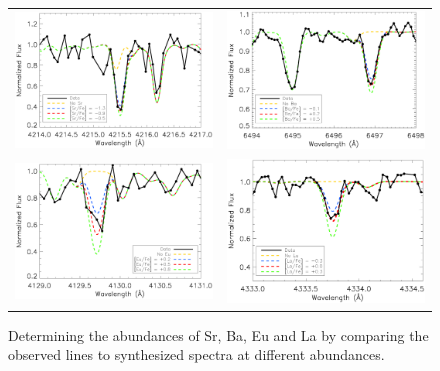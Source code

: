 \documentclass[manuscript]{aastex}
\begin{document}
\begin{figure}
 \begin{center}
  \begin{tabular}{cc}
  \includegraphics[width=8.5cm]{sr4215_synth.ps} & \includegraphics[width=8.5cm]{ba6496_synth.ps} \\
  \includegraphics[width=8.5cm]{eu4129_synth.ps} &  \includegraphics[width=8.5cm]{la4333_synth.ps} \\
  \end{tabular}
  \caption{Determining the abundances of Sr, Ba, Eu and La by comparing the observed lines to synthesized spectra at different abundances. }
  \label{fig:nc_syn}
 \end{center}
\end{figure}
\end{document}
